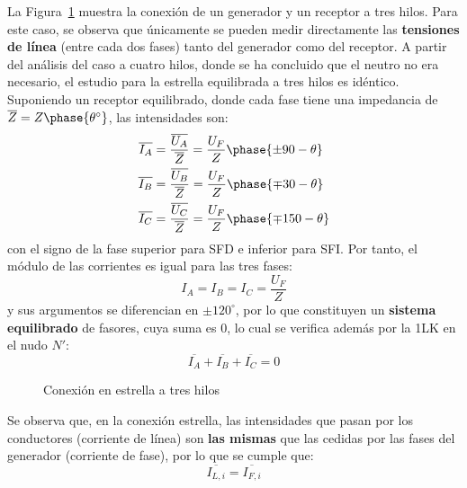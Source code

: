 \documentclass[11pt]{book} %
\numberwithin{dummy}{section}
\theoremstyle{ocrenumbox}
\theoremstyle{blacknumex}
\theoremstyle{blacknumbox}
\theoremstyle{ocrenum}
\begin{document}
	La Figura~\ref{fig.conexion_estrella_3} muestra la conexión de un generador y un receptor a tres hilos. Para este caso, se observa que únicamente se pueden medir directamente las \textbf{tensiones de línea} (entre cada dos fases) tanto del generador como del receptor. A partir del análisis del caso a cuatro hilos, donde se ha concluido que el neutro no era necesario, el estudio para la estrella equilibrada a tres hilos es idéntico. Suponiendo un receptor equilibrado, donde cada fase tiene una impedancia de $\overline{Z}=Z\phase{\theta^\circ}$, las intensidades son:
	\begin{align*}
      \overline{I_A} &= \frac{\overline{U_A}}{\overline{Z}} = \frac{U_F}{Z}\phase{{\pm 90} - \theta} \\
      \overline{I_B} &= \frac{\overline{U_B}}{\overline{Z}} = \frac{U_F}{Z}\phase{{\mp 30} - \theta}\\
      \overline{I_C} &= \frac{\overline{U_C}}{\overline{Z}} = \frac{U_F}{Z}\phase{{\mp 150} - \theta}
    \end{align*}
    con el signo de la fase superior para SFD e inferior para SFI. Por tanto, el módulo de las corrientes es igual para las tres fases: 
    \begin{equation}
        \boxed{I_A = I_B = I_C = \dfrac{U_F}{Z}}
    \end{equation}
    y sus argumentos se diferencian en $\pm120^\circ$, por lo que constituyen un \textbf{sistema equilibrado} de fasores, cuya suma es 0, lo cual se verifica además por la 1LK en el nudo $N'$: 
    \begin{equation*}
        \overline{I_A}  + \overline{I_B} + \overline{I_C} = 0
    \end{equation*}
	\begin{figure}[tbp]
		\centering
		\hfill
		\caption{Conexión en estrella a tres hilos}
		\label{fig.conexion_estrella_3}
	\end{figure}

	Se observa que, en la conexión estrella, las intensidades que pasan por los conductores (corriente de línea) son \textbf{las mismas} que las cedidas por las fases del generador (corriente de fase), por lo que se cumple que:
	\begin{equation}
	    \boxed{\overline{I_{L,i}}=\overline{I_{F,i}}}
	\end{equation}
	
\end{document}
